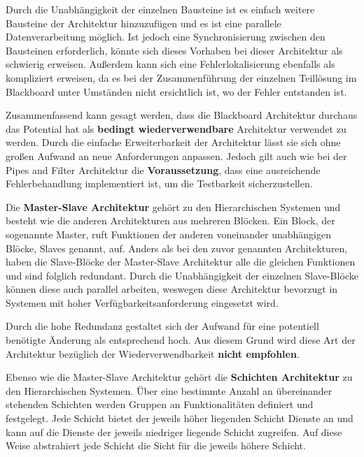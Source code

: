 \documentclass[utf8,biblatex]{lni}
\begin{document}
Durch die Unabhängigkeit der einzelnen Bausteine ist es einfach weitere Bausteine der Architektur hinzuzufügen und es ist eine parallele Datenverarbeitung möglich. Ist jedoch eine Synchronisierung zwischen den Bausteinen erforderlich, könnte sich dieses Vorhaben bei dieser Architektur als schwierig erweisen. Außerdem kann sich eine Fehlerlokalisierung ebenfalls als kompliziert erweisen, da es bei der Zusammenführung der einzelnen Teillösung im Blackboard unter Umständen nicht ersichtlich ist, wo der Fehler entstanden ist.

Zusammenfassend kann gesagt werden, dass die Blackboard Architektur durchaus das Potential hat als \textbf{bedingt wiederverwendbare} Architektur verwendet zu werden. Durch die einfache Erweiterbarkeit der Architektur lässt sie sich ohne großen Aufwand an neue Anforderungen anpassen. Jedoch gilt auch wie bei der Pipes and Filter Architektur die \textbf{Voraussetzung}, dass eine ausreichende Fehlerbehandlung implementiert ist, um die Testbarkeit sicherzustellen.


Die \textbf{Master-Slave Architektur} gehört zu den Hierarchischen Systemen und besteht wie die anderen Architekturen aus mehreren Blöcken. Ein Block, der sogenannte Master, ruft Funktionen der anderen voneinander unabhängigen Blöcke, Slaves genannt, auf. Anders als bei den zuvor genannten Architekturen, haben die Slave-Blöcke der Master-Slave Architektur alle die gleichen Funktionen und sind folglich redundant. Durch die Unabhängigkeit der einzelnen Slave-Blöcke können diese auch parallel arbeiten, weswegen diese Architektur bevorzugt in Systemen mit hoher Verfügbarkeitsanforderung eingesetzt wird.

Durch die hohe Redundanz gestaltet sich der Aufwand für eine potentiell benötigte Änderung als entsprechend hoch. Aus diesem Grund wird diese Art der Architektur bezüglich der Wiederverwendbarkeit \textbf{nicht empfohlen}.


Ebenso wie die Master-Slave Architektur gehört die \textbf{Schichten Architektur} zu den Hierarchischen Systemen. Über eine bestimmte Anzahl an übereinander stehenden Schichten werden Gruppen an Funktionalitäten definiert und festgelegt. Jede Schicht bietet der jeweils höher liegenden Schicht Dienste an und kann auf die Dienste der jeweils niedriger liegende Schicht zugreifen. Auf diese Weise abstrahiert jede Schicht die Sicht für die jeweils höhere Schicht.
\end{document}
